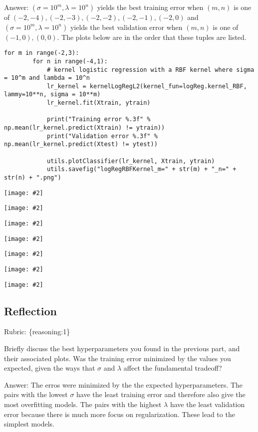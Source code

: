 \documentclass{article}
\def\rubric#1{\gre{Rubric: \{#1\}}}{}
\def\gre#1{{\color{gre}#1}}
\def\ans#1{\gre{Answer: #1}}{}
\newcommand{\centerfig}[2]{\begin{center}\texttt{[image: \#2]}\end{center}}
\begin{document}
\ans{$(\sigma = 10^m, \lambda = 10^n)$ yields the best training error when $(m, n)$ is one of $(-2,-4), (-2, -3), (-2, -2), (-2, -1), (-2, 0)$ and $(\sigma = 10^m, \lambda = 10^n)$ yields the best validation error when $(m,n)$ is one of $(-1, 0), (0,0)$. The plots below are in the order that these tuples are listed.}
\begin{lstlisting}[style=base]
	for m in range(-2,3):
		for n in range(-4,1):
			# kernel logistic regression with a RBF kernel where sigma = 10^m and lambda = 10^n
			lr_kernel = kernelLogRegL2(kernel_fun=logReg.kernel_RBF, lammy=10**n, sigma = 10**m)
			lr_kernel.fit(Xtrain, ytrain)
			
			print("Training error %.3f" % np.mean(lr_kernel.predict(Xtrain) != ytrain))
			print("Validation error %.3f" % np.mean(lr_kernel.predict(Xtest) != ytest))
			
			utils.plotClassifier(lr_kernel, Xtrain, ytrain)
			utils.savefig("logRegRBFKernel_m=" + str(m) + "_n=" + str(n) + ".png")        		
\end{lstlisting}

\centerfig{0.5}{../figs/logRegRBFKernel_m=-2_n=0.png}

\centerfig{0.5}{../figs/logRegRBFKernel_m=-2_n=-1.png}

\centerfig{0.5}{../figs/logRegRBFKernel_m=-2_n=-2.png}

\centerfig{0.5}{../figs/logRegRBFKernel_m=-2_n=-3.png}

\centerfig{0.5}{../figs/logRegRBFKernel_m=-2_n=-4.png}



\centerfig{0.5}{../figs/logRegRBFKernel_m=0_n=-1.png}

\centerfig{0.5}{../figs/logRegRBFKernel_m=0_n=0.png}

\subsection{Reflection}
\rubric{reasoning:1}

Briefly discuss the best hyperparameters you found in the previous part, and their associated plots. Was the training error minimized by the values you expected, given the ways that $\sigma$ and $\lambda$ affect the fundamental tradeoff?

\ans{The erros were minimized by the the expected hyperparameters. The pairs with the lowest $\sigma$ have the least training error and therefore also give the most overfitting models. The pairs with the highest $\lambda$ have the least validation error because there is much more focus on regularization. These lead to the simplest models.}
\end{document}

